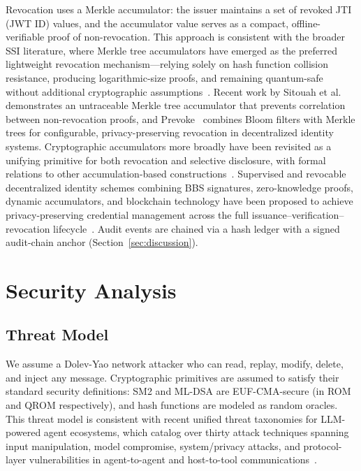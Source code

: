 \documentclass[10pt,twocolumn]{IEEEtran}
\begin{document}
Revocation uses a Merkle accumulator: the issuer maintains a set of
revoked JTI (JWT ID) values, and the accumulator value serves as a
compact, offline-verifiable proof of non-revocation. This approach is
consistent with the broader SSI literature, where Merkle tree
accumulators have emerged as the preferred lightweight revocation
mechanism---relying solely on hash function collision resistance,
producing logarithmic-size proofs, and remaining quantum-safe without
additional cryptographic assumptions~\cite{ref:revocation-survey}.
Recent work by Sitouah et al.~\cite{ref:merkle-revocation} demonstrates
an untraceable Merkle tree accumulator that prevents correlation
between non-revocation proofs, and Prevoke~\cite{ref:prevoke} combines
Bloom filters with Merkle trees for configurable, privacy-preserving
revocation in decentralized identity systems. Cryptographic accumulators
more broadly have been revisited as a unifying primitive for both
revocation and selective disclosure, with formal relations to other
accumulation-based constructions~\cite{ref:revocation-accumulator}.
Supervised and revocable decentralized identity schemes combining
BBS signatures, zero-knowledge proofs, dynamic accumulators, and
blockchain technology have been proposed to achieve privacy-preserving
credential management across the full issuance--verification--revocation
lifecycle~\cite{ref:he-ssi-revocation}. Audit events are chained
via a hash ledger with a signed audit-chain anchor
(Section~\ref{sec:discussion}).

\section{Security Analysis}

\subsection{Threat Model}

We assume a Dolev-Yao network attacker who can read, replay, modify,
delete, and inject any message. Cryptographic primitives are assumed
to satisfy their standard security definitions: SM2 and ML-DSA are
EUF-CMA-secure (in ROM and QROM respectively), and hash functions are
modeled as random oracles. This threat model is consistent with
recent unified threat taxonomies for LLM-powered agent ecosystems,
which catalog over thirty attack techniques spanning input manipulation,
model compromise, system/privacy attacks, and protocol-layer
vulnerabilities in agent-to-agent and host-to-tool
communications~\cite{ref:llm-agent-threats}.
\end{document}
